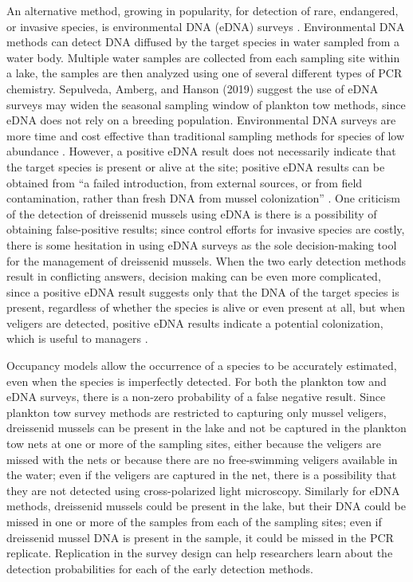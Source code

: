 \documentclass[12pt]{article}\usepackage[]{graphicx}\usepackage[]{color}
\begin{document}
An alternative method, growing in popularity, for detection of rare, endangered, or invasive species, is environmental DNA (eDNA) surveys \cite{Schmelzle}. Environmental DNA methods can detect DNA diffused by the target species in water sampled from a water body. Multiple water samples are collected from each sampling site within a lake, the samples are then analyzed using one of several different types of PCR chemistry. Sepulveda, Amberg, and Hanson (2019) suggest the use of eDNA surveys may widen the seasonal sampling window of plankton tow methods, since eDNA does not rely on a breeding population. Environmental DNA surveys are more time and cost effective than traditional sampling methods for species of low abundance \cite{Rees}. However, a positive eDNA result does not necessarily indicate that the target species is present or alive at the site; positive eDNA results can be obtained from ``a failed introduction, from external sources, or from field contamination, rather than fresh DNA from mussel colonization'' \cite{Sepulveda:eDNA}. One criticism of the detection of dreissenid mussels using eDNA is there is a possibility of obtaining false-positive results; since control efforts for invasive species are costly, there is some hesitation in using eDNA surveys as the sole decision-making tool for the management of dreissenid mussels. When the two early detection methods result in conflicting answers, decision making can be even more complicated, since a positive eDNA result suggests only that the DNA of the target species is present, regardless of whether the species is alive or even present at all, but when veligers are detected, positive eDNA results indicate a potential colonization, which is useful to managers \cite{Holser:body}. 

Occupancy models allow the occurrence of a species to be accurately estimated, even when the species is imperfectly detected. For both the plankton tow and eDNA surveys, there is a non-zero probability of a false negative result. Since plankton tow survey methods are restricted to capturing only mussel veligers, dreissenid mussels can be present in the lake and not be captured in the plankton tow nets at one or more of the sampling sites, either because the veligers are missed with the nets or because there are no free-swimming veligers available in the water; even if the veligers are captured in the net, there is a possibility that they are not detected using cross-polarized light microscopy. Similarly for eDNA methods, dreissenid mussels could be present in the lake, but their DNA could be missed in one or more of the samples from each of the sampling sites; even if dreissenid mussel DNA is present in the sample, it could be missed in the PCR replicate. Replication in the survey design can help researchers learn about the detection probabilities for each of the early detection methods. 
\end{document}
